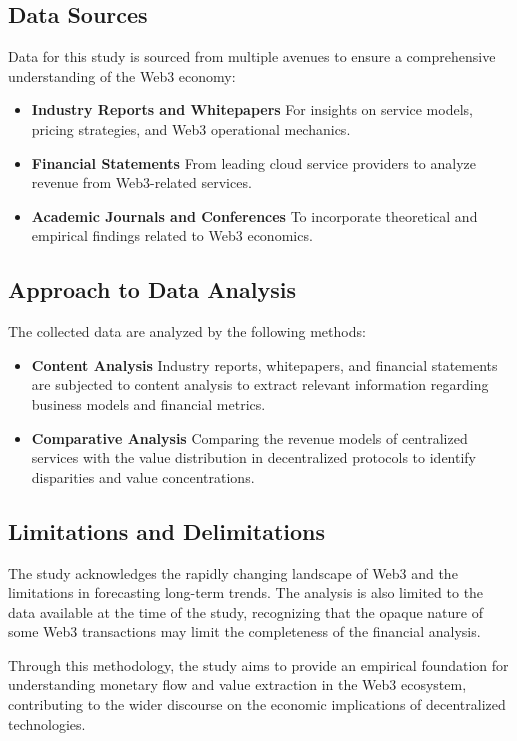 \documentclass{article}
\begin{document}
\subsection{Data Sources}
Data for this study is sourced from multiple avenues to ensure a comprehensive understanding of the Web3 economy:
\begin{itemize}
\item \textbf{Industry Reports and Whitepapers} For insights on service models, pricing strategies, and Web3 operational mechanics.
\item \textbf{Financial Statements} From leading cloud service providers to analyze revenue from Web3-related services.
\item \textbf{Academic Journals and Conferences} To incorporate theoretical and empirical findings related to Web3 economics.
\end{itemize}

\subsection{Approach to Data Analysis}
The collected data are analyzed by the following methods:

\begin{itemize}
\item \textbf{Content Analysis} Industry reports, whitepapers, and financial statements are subjected to content analysis to extract relevant information regarding business models and financial metrics.
\item \textbf{Comparative Analysis} Comparing the revenue models of centralized services with the value distribution in decentralized protocols to identify disparities and value concentrations.
\end{itemize}

\subsection{Limitations and Delimitations}
The study acknowledges the rapidly changing landscape of Web3 and the limitations in forecasting long-term trends. The analysis is also limited to the data available at the time of the study, recognizing that the opaque nature of some Web3 transactions may limit the completeness of the financial analysis.

Through this methodology, the study aims to provide an empirical foundation for understanding monetary flow and value extraction in the Web3 ecosystem, contributing to the wider discourse on the economic implications of decentralized technologies.
\end{document}
